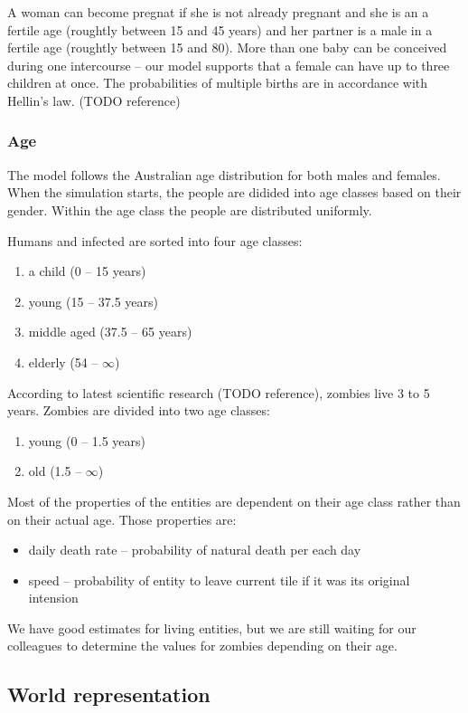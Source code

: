 \documentclass[a4paper]{article}
\begin{document}
A woman can become pregnat if she is not already pregnant and she is an a fertile age (roughtly between 15 and 45 years) and her partner is a male in a fertile age (roughtly between 15 and 80).
More than one baby can be conceived during one intercourse -- our model supports that a female can have up to three children at once.
The probabilities of multiple births are in accordance with Hellin's law. (TODO reference)

\subsubsection{Age}

The model follows the Australian age distribution for both males and females.
When the simulation starts, the people are didided into age classes based on their gender.
Within the age class the people are distributed uniformly.

Humans and infected are sorted into four age classes:
\begin{enumerate}
\item a child (0 -- 15 years)
\item young (15 -- 37.5 years)
\item middle aged (37.5 -- 65 years)
\item elderly (54 -- $\infty$)
\end{enumerate}

According to latest scientific research (TODO reference), zombies live 3 to 5 years. 
Zombies are divided into two age classes:
\begin{enumerate}
\item young (0 -- 1.5 years)
\item old (1.5 -- $\infty$)
\end{enumerate}

Most of the properties of the entities are dependent on their age class rather than on their actual age.
Those properties are:
\begin{itemize}
\item daily death rate -- probability of natural death per each day
\item speed -- probability of entity to leave current tile if it was its original intension
\end{itemize}

We have good estimates for living entities, but we are still waiting for our colleagues to determine the values for zombies depending on their age.

\subsection{World representation}
\end{document}
